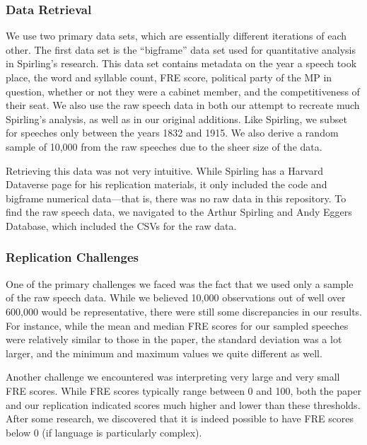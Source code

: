 \documentclass[
  letterpaper,
  DIV=11,
  numbers=noendperiod]{scrartcl}
\begin{document}
\subsubsection{Data Retrieval}\label{data-retrieval}

We use two primary data sets, which are essentially different iterations
of each other. The first data set is the ``bigframe'' data set used for
quantitative analysis in Spirling's research. This data set contains
metadata on the year a speech took place, the word and syllable count,
FRE score, political party of the MP in question, whether or not they
were a cabinet member, and the competitiveness of their seat. We also
use the raw speech data in both our attempt to recreate much Spirling's
analysis, as well as in our original additions. Like Spirling, we subset
for speeches only between the years 1832 and 1915. We also derive a
random sample of 10,000 from the raw speeches due to the sheer size of
the data.~

Retrieving this data was not very intuitive. While Spirling has a
Harvard Dataverse page for his replication materials, it only included
the code and bigframe numerical data---that is, there was no raw data in
this repository. To find the raw speech data, we navigated to the Arthur
Spirling and Andy Eggers Database, which included the CSVs for the raw
data.

\subsubsection{Replication Challenges}\label{replication-challenges}

One of the primary challenges we faced was the fact that we used only a
sample of the raw speech data. While we believed 10,000 observations out
of well over 600,000 would be representative, there were still some
discrepancies in our results. For instance, while the mean and median
FRE scores for our sampled speeches were relatively similar to those in
the paper, the standard deviation was a lot larger, and the minimum and
maximum values we quite different as well.

Another challenge we encountered was interpreting very large and very
small FRE scores. While FRE scores typically range between 0 and 100,
both the paper and our replication indicated scores much higher and
lower than these thresholds. After some research, we discovered that it
is indeed possible to have FRE scores below 0 (if language is
particularly complex).
\end{document}
